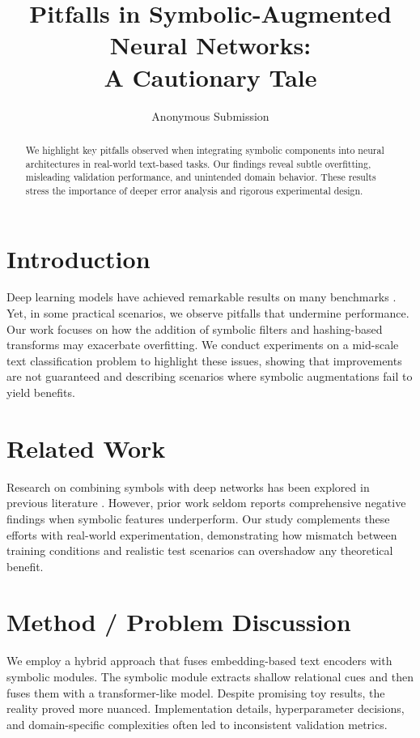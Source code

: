 \documentclass[12pt]{article}
\title{\vspace{-1cm}Pitfalls in Symbolic-Augmented Neural Networks: \\ A Cautionary Tale}
\author{Anonymous Submission}
\date{}
\begin{document}
\maketitle

\begin{abstract}
We highlight key pitfalls observed when integrating symbolic components into neural architectures in real-world text-based tasks. Our findings reveal subtle overfitting, misleading validation performance, and unintended domain behavior. These results stress the importance of deeper error analysis and rigorous experimental design.
\end{abstract}

\section{Introduction}
Deep learning models have achieved remarkable results on many benchmarks \cite{chen2020big,lecun1998gradient}. Yet, in some practical scenarios, we observe pitfalls that undermine performance. Our work focuses on how the addition of symbolic filters and hashing-based transforms may exacerbate overfitting. We conduct experiments on a mid-scale text classification problem to highlight these issues, showing that improvements are not guaranteed and describing scenarios where symbolic augmentations fail to yield benefits.

\section{Related Work}
Research on combining symbols with deep networks has been explored in previous literature \cite{kingma2014adam}. However, prior work seldom reports comprehensive negative findings when symbolic features underperform. Our study complements these efforts with real-world experimentation, demonstrating how mismatch between training conditions and realistic test scenarios can overshadow any theoretical benefit.

\section{Method / Problem Discussion}
We employ a hybrid approach that fuses embedding-based text encoders with symbolic modules. The symbolic module extracts shallow relational cues and then fuses them with a transformer-like model. Despite promising toy results, the reality proved more nuanced. Implementation details, hyperparameter decisions, and domain-specific complexities often led to inconsistent validation metrics.
\end{document}

